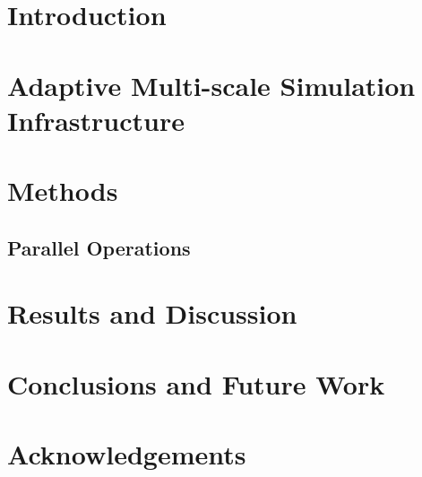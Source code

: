 \documentclass[11pt]{article}
\begin{document}
\maketitle
\begin{abstract}
\end{abstract}
\section{Introduction}\label{introduction}

\section{Adaptive Multi-scale Simulation Infrastructure}\label{amsi}

\section{Methods}\label{methods}

\subsection{Parallel Operations}\label{parallel}

\section{Results and Discussion}\label{results}

\section{Conclusions and Future Work}\label{future_work}

\section{Acknowledgements}


\end{document}
